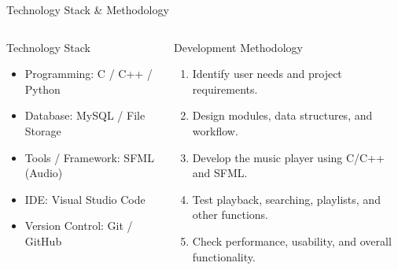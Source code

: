 \documentclass[aspectratio=169,11pt]{beamer}
\begin{document}
\begin{frame}{Technology Stack \& Methodology}

\begin{columns}[T,totalwidth=\textwidth]

\begin{block}{Technology Stack}
\begin{itemize}\itemsep1pt\parskip0pt
\item Programming: C / C++ / Python
\item Database: MySQL / File Storage
\item Tools / Framework: SFML (Audio)
\item IDE: Visual Studio Code
\item Version Control: Git / GitHub
\end{itemize}
\end{block}

\begin{block}{Development Methodology}
\begin{enumerate}\itemsep1pt\parskip0pt
\item Identify user needs and project requirements.
\item Design modules, data structures, and workflow.
\item Develop the music player using C/C++ and SFML.
\item Test playback, searching, playlists, and other functions.
\item Check performance, usability, and overall functionality.
\end{enumerate}
\end{block}

\end{columns}
\end{frame}
\end{document}
